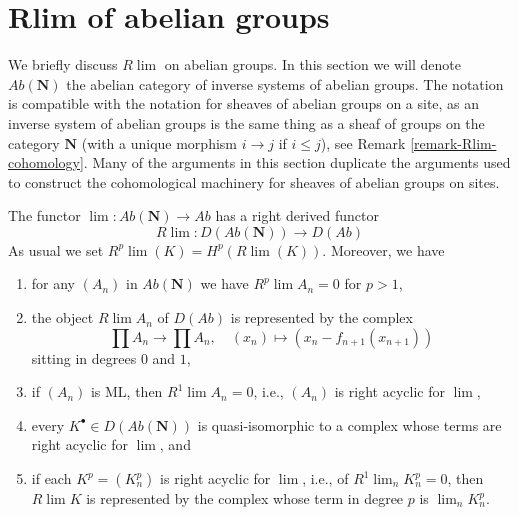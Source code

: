 \section{Rlim of abelian groups}
\label{section-Rlim}

\noindent
We briefly discuss $R\lim$ on abelian groups.
In this section we will denote $\textit{Ab}(\mathbf{N})$ the
abelian category of inverse systems of abelian groups.
The notation is compatible with the notation for sheaves of abelian
groups on a site, as an inverse system of abelian groups is
the same thing as a sheaf of groups on the category $\mathbf{N}$
(with a unique morphism $i \to j$ if $i \leq j$), see
Remark \ref{remark-Rlim-cohomology}. Many of the arguments in this
section duplicate the arguments used to construct the cohomological
machinery for sheaves of abelian groups on sites.

\begin{lemma}
\label{lemma-compute-Rlim}
The functor $\lim : \textit{Ab}(\mathbf{N}) \to \textit{Ab}$
has a right derived functor
\begin{equation}
\label{equation-Rlim}
R\lim : D(\textit{Ab}(\mathbf{N})) \longrightarrow D(\textit{Ab})
\end{equation}
As usual we set $R^p\lim(K) = H^p(R\lim(K))$. Moreover, we have
\begin{enumerate}
\item for any $(A_n)$ in $\textit{Ab}(\mathbf{N})$ we have
$R^p\lim A_n = 0$ for $p > 1$,
\item the object $R\lim A_n$ of $D(\textit{Ab})$ is represented
by the complex
$$
\prod A_n \to \prod A_n,\quad (x_n) \mapsto (x_n - f_{n + 1}(x_{n + 1}))
$$
sitting in degrees $0$ and $1$,
\item if $(A_n)$ is ML, then $R^1\lim A_n = 0$, i.e., $(A_n)$
is right acyclic for $\lim$,
\item every $K^\bullet \in D(\textit{Ab}(\mathbf{N}))$ is quasi-isomorphic
to a complex whose terms are right acyclic for $\lim$, and
\item if each $K^p = (K^p_n)$ is right acyclic for $\lim$, i.e.,
of $R^1\lim_n K^p_n = 0$, then $R\lim K$ is represented by the
complex whose term in degree $p$ is $\lim_n K_n^p$.
\end{enumerate}
\end{lemma}

